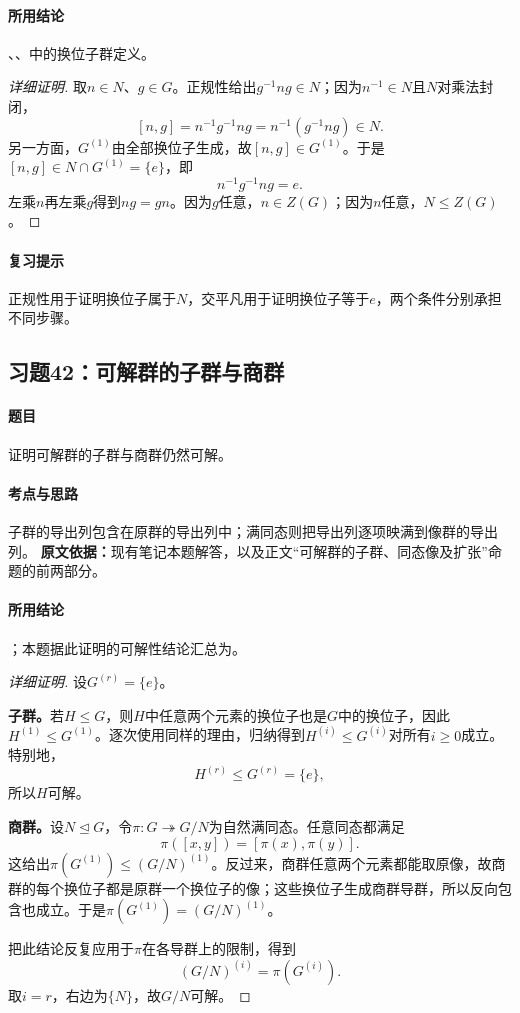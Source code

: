 \paragraph{所用结论}、、中的换位子群定义。
\begin{proof}[详细证明]
取$n\in N$、$g\in G$。正规性给出$g^{-1}ng\in N$；因为$n^{-1}\in N$且$N$对乘法封闭，
\[
[n,g]=n^{-1}g^{-1}ng=n^{-1}(g^{-1}ng)\in N.
\]
另一方面，$G^{(1)}$由全部换位子生成，故$[n,g]\in G^{(1)}$。于是$[n,g]\in N\cap G^{(1)}=\{e\}$，即
\[
n^{-1}g^{-1}ng=e.
\]
左乘$n$再左乘$g$得到$ng=gn$。因为$g$任意，$n\in Z(G)$；因为$n$任意，$N\le Z(G)$。
\end{proof}
\paragraph{复习提示}正规性用于证明换位子属于$N$，交平凡用于证明换位子等于$e$，两个条件分别承担不同步骤。

\subsection{习题42：可解群的子群与商群}
\paragraph{题目}证明可解群的子群与商群仍然可解。
\paragraph{考点与思路}子群的导出列包含在原群的导出列中；满同态则把导出列逐项映满到像群的导出列。
\textbf{原文依据：}现有笔记本题解答，以及正文“可解群的子群、同态像及扩张”命题的前两部分。
\paragraph{所用结论}；本题据此证明的可解性结论汇总为。
\begin{proof}[详细证明]
设$G^{(r)}=\{e\}$。

\textbf{子群。}若$H\le G$，则$H$中任意两个元素的换位子也是$G$中的换位子，因此$H^{(1)}\le G^{(1)}$。逐次使用同样的理由，归纳得到$H^{(i)}\le G^{(i)}$对所有$i\ge0$成立。特别地，
\[
H^{(r)}\le G^{(r)}=\{e\},
\]
所以$H$可解。

\textbf{商群。}设$N\trianglelefteq G$，令$\pi:G\twoheadrightarrow G/N$为自然满同态。任意同态都满足
\[
\pi([x,y])=[\pi(x),\pi(y)].
\]
这给出$\pi(G^{(1)})\le(G/N)^{(1)}$。反过来，商群任意两个元素都能取原像，故商群的每个换位子都是原群一个换位子的像；这些换位子生成商群导群，所以反向包含也成立。于是$\pi(G^{(1)})=(G/N)^{(1)}$。

把此结论反复应用于$\pi$在各导群上的限制，得到
\[
(G/N)^{(i)}=\pi(G^{(i)}).
\]
取$i=r$，右边为$\{N\}$，故$G/N$可解。
\end{proof}
